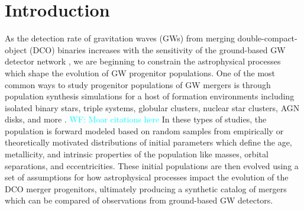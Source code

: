 \documentclass[twocolumn]{aastex631}
\newcommand{\kw}[1]{{\color{rb4}[KW: #1 ]}}
\newcommand{\wf}[1]{\textcolor{cyan}{WF: #1}}
\newcommand{\kb}[1]{\textcolor{pink}{#1}}
\begin{document}
    \section{Introduction}
    As the detection rate of gravitation waves (GWs) from merging
    double-compact-object (DCO) binaries increases with the sensitivity of the
    ground-based GW detector network
    \citep{Abbott2018,LIGOScientificCollaboration2015,Buikema2020,Tse2019,Acernese2015,Acernese2019,Aso2013,Akutsu2021},
    we are beginning to constrain the astrophysical processes which shape the
    evolution of GW progenitor populations. One of the most common ways to study
    progenitor populations of GW mergers is through population synthesis simulations
    for a host of formation environments including isolated binary stars, triple
    systems, globular clusters, nuclear star clusters, AGN disks, and more
    \citep{Mandel2022}. \wf{Moar citations here} In these types of studies, the
    population is forward modeled based on random samples from empirically or
    theoretically motivated distributions of initial parameters which define the
    age, metallicity, and intrinsic properties of the population like masses,
    orbital separations, and eccentricities. These initial populations are then
    evolved using a set of assumptions for how astrophysical processes impact the
    evolution of the DCO merger progenitors, ultimately producing a synthetic
    catalog of mergers which can be compared of observations from ground-based GW
    detectors.
    


\end{document}

